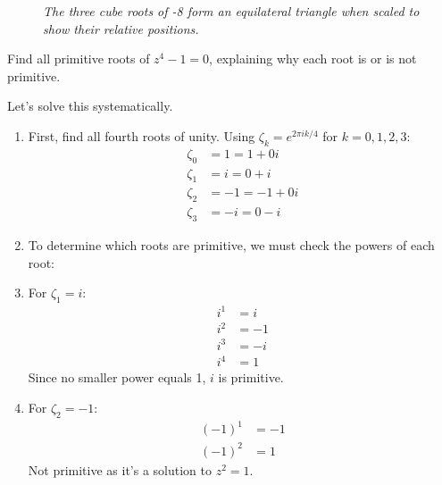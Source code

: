 \begin{example}
\begin{solution}
\begin{figure}[H]
\caption{\textit{The three cube roots of -8 form an equilateral triangle when scaled to show their relative positions.}}
\end{figure}
\end{solution}
\end{example}
\exampleline
\begin{example}
Find all primitive roots of $z^4 - 1 = 0$, explaining why each root is or is not primitive.

\begin{solution}
Let's solve this systematically.

\begin{enumerate}
\item First, find all fourth roots of unity. Using $\zeta_k = e^{2\pi i k/4}$ for $k = 0,1,2,3$:
  \begin{align*}
  \zeta_0 &= 1 = 1 + 0i \\
  \zeta_1 &= i = 0 + i \\
  \zeta_2 &= -1 = -1 + 0i \\
  \zeta_3 &= -i = 0 - i
  \end{align*}

\item To determine which roots are primitive, we must check the powers of each root:
  
\item For $\zeta_1 = i$:
  \begin{align*}
  i^1 &= i \\
  i^2 &= -1 \\
  i^3 &= -i \\
  i^4 &= 1
  \end{align*}
  Since no smaller power equals 1, $i$ is primitive.

\item For $\zeta_2 = -1$:
  \begin{align*}
  (-1)^1 &= -1 \\
  (-1)^2 &= 1
  \end{align*}
  Not primitive as it's a solution to $z^2 = 1$.


\end{enumerate}
\end{solution}
\end{example}
